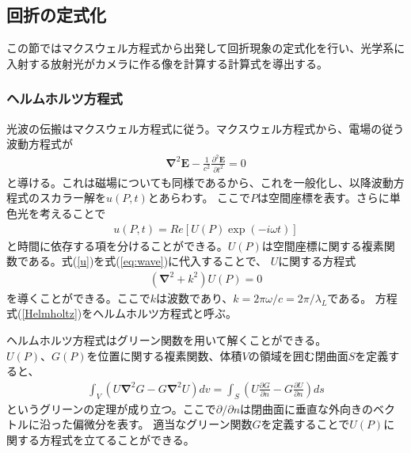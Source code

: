 \documentclass[a4paper,11pt,uplatex]{jsbook}
\begin{document}
\subsection{回折の定式化}\label{sec:rayleigh}
この節ではマクスウェル方程式から出発して回折現象の定式化を行い、光学系に入射する放射光がカメラに作る像を計算する計算式を導出する。

\subsubsection{ヘルムホルツ方程式}
光波の伝搬はマクスウェル方程式に従う。マクスウェル方程式から、電場の従う波動方程式が
\begin{eqnarray}
  \bm{\nabla}^2\bm{E} - \frac{1}{c^2}\frac{\partial^2\bm{E}}{\partial t^2} = 0 \label{eq:wave}
\end{eqnarray}
と導ける。これは磁場についても同様であるから、これを一般化し、以降波動方程式のスカラー解を$u(P,t)$とあらわす。
ここで$P$は空間座標を表す。さらに単色光を考えることで
\begin{eqnarray}
  u(P,t) = Re\left[U(P)\exp (-i\omega t)\right] \label{u}
\end{eqnarray}
と時間に依存する項を分けることができる。$U(P)$は空間座標に関する複素関数である。式(\ref{u})を式(\ref{eq:wave})に代入することで、
$U$に関する方程式
\begin{eqnarray}
  \left(\bm{\nabla}^2 + k^2\right)U(P) = 0 \label{Helmholtz}
\end{eqnarray}
を導くことができる。ここで$k$は波数であり、$k = 2\pi \omega/c = 2\pi/\lambda_L$である。
方程式(\ref{Helmholtz})をヘルムホルツ方程式と呼ぶ。

ヘルムホルツ方程式はグリーン関数を用いて解くことができる。
$U(P)、G(P)$を位置に関する複素関数、体積$V$の領域を囲む閉曲面$S$を定義すると、
\begin{eqnarray}
  \int_V \left(U\bm{\nabla}^2G - G\bm{\nabla}^2U\right) dv = \int_S \left( U\frac{\partial G}{\partial n} - G\frac{\partial U}{\partial n}\right) ds \label{green}
\end{eqnarray}
というグリーンの定理が成り立つ。ここで$\partial/\partial n$は閉曲面に垂直な外向きのベクトルに沿った偏微分を表す。
適当なグリーン関数$G$を定義することで$U(P)$に関する方程式を立てることができる。
\end{document}
